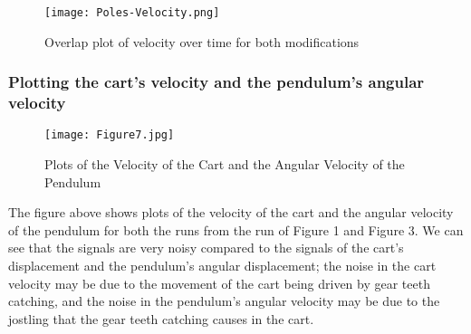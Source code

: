 \documentclass[11pt, twoside, letterpaper]{article}   	%
\begin{document}
\begin{figure}[htbp]
\begin{center}
\texttt{[image: Poles-Velocity.png]}
\caption{Overlap plot of velocity over time for both modifications}
\label{default}
\end{center}
\end{figure}
\FloatBarrier

\newpage
\newpage
\subsubsection{Plotting the cart's velocity and the pendulum's angular velocity}

\begin{figure}[htbp]
\begin{center}
\texttt{[image: Figure7.jpg]}
\caption{Plots of the Velocity of the Cart and the Angular Velocity of the Pendulum}
\label{default}
\end{center}
\end{figure}
\FloatBarrier

The figure above shows plots of the velocity of the cart and the angular velocity of the pendulum for both the runs from the run of Figure 1 and Figure 3. We can see that the signals are very noisy compared to the signals of the cart's displacement and the pendulum's angular displacement; the noise in the cart velocity may be due to the movement of the cart being driven by gear teeth catching, and the noise in the pendulum's angular velocity may be due to the jostling that the gear teeth catching causes in the cart.
\end{document}
